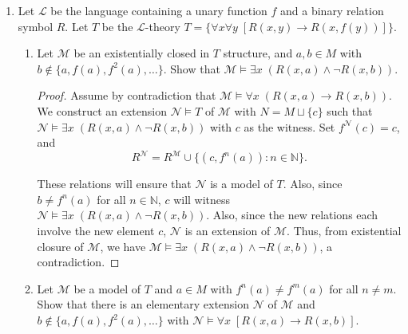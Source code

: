 \documentclass{article}
\begin{document}
\begin{enumerate}[label={\bf Q\arabic*:}]
  \item Let $\mathcal{L}$ be the language containing a unary function $f$
    and a binary relation symbol $R$. Let $T$ be the $\mathcal{L}$-theory
    $T=\{\forall x\forall y\; [R(x,y)\rightarrow R(x,f(y))]\}$.

    \begin{enumerate}
      \item Let $\mathcal{M}$ be an existentially closed in $T$ structure,
        and $a,b\in M$ with $b\not\in\{a,f(a),f^2(a),\ldots\}$. Show that
        $\mathcal{M}\models \exists x\; (R(x,a)\wedge\neg R(x,b))$.

        \begin{proof}
          Assume by contradiction that $\mathcal{M}\models \forall x\;
          (R(x,a)\rightarrow R(x,b))$. We construct an extension
          $\mathcal{N}\models T$ of $\mathcal{M}$ with $N=M\sqcup\{c\}$
          such that $\mathcal{N}\models \exists x\; (R(x,a)\wedge\neg
          R(x,b))$ with $c$ as the witness. Set $f^\mathcal{N}(c)=c$, and
          \[R^\mathcal{N}= R^\mathcal{M} \cup
          \{(c,f^n(a)):n\in\mathbb{N}\}.\]

          These relations will ensure that $\mathcal{N}$ is a model of $T$.
          Also, since $b\neq f^n(a)$ for all $n\in\mathbb{N}$, $c$ will
          witness $\mathcal{N}\models \exists x\; (R(x,a)\wedge\neg
          R(x,b))$. Also, since the new relations each involve the new
          element $c$, $\mathcal{N}$ is an extension of $\mathcal{M}$.
          Thus, from existential closure of $\mathcal{M}$, we have
          $\mathcal{M}\models \exists x\; (R(x,a)\wedge\neg R(x,b))$, a
          contradiction.
        \end{proof}

      \item Let $\mathcal{M}$ be a model of $T$ and $a\in M$ with
        $f^n(a)\neq f^m(a)$ for all $n\neq m$. Show that there is an
        elementary extension $\mathcal{N}$ of $\mathcal{M}$ and
        $b\not\in\{a,f(a),f^2(a),\ldots\}$ with $\mathcal{N}\models\forall
        x\; [R(x,a)\rightarrow R(x,b)]$.


\end{enumerate}
\end{enumerate}
\end{document}
